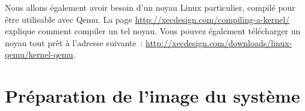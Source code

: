 \documentclass{article}
\begin{document}
Nous allons également avoir besoin d'un noyau Linux particulier, compilé pour être utilisable avec Qemu.
La page
\href{https://web.archive.org/web/20150214035104/http://xecdesign.com/compiling-a-kernel/}{http://xecdesign.com/compiling-a-kernel/}
explique comment compiler un tel noyau.
Vous pouvez également télécharger un noyau tout prêt à l'adresse suivante~:
\href{https://web.archive.org/web/20150419093434/http://www.xecdesign.com/downloads/linux-qemu/kernel-qemu}{http://xecdesign.com/downloads/linux-qemu/kernel-qemu}.



\section{Préparation de l'image du système}\label{sec:setup-image}
\end{document}
